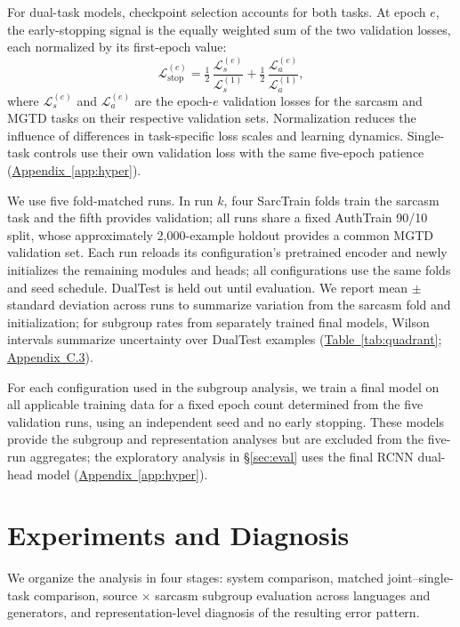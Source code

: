 \documentclass[11pt]{article}
\newcommand{\Sref}[1]{\hyperref[#1]{\S\ref*{#1}}}
\newcommand{\Appref}[1]{\hyperref[#1]{Appendix~\ref*{#1}}}
\newcommand{\Tabref}[1]{\hyperref[#1]{Table~\ref*{#1}}}
\begin{document}
For dual-task models, checkpoint selection accounts for both tasks. At epoch $e$, the early-stopping signal is the equally weighted sum of the two validation losses, each normalized by its first-epoch value:
\begin{equation}
\label{eq:stop}
\mathcal{L}_{\mathrm{stop}}^{(e)}=\tfrac{1}{2}\,\frac{\mathcal{L}_{s}^{(e)}}{\mathcal{L}_{s}^{(1)}}+\tfrac{1}{2}\,\frac{\mathcal{L}_{a}^{(e)}}{\mathcal{L}_{a}^{(1)}},
\end{equation}
where $\mathcal{L}_{s}^{(e)}$ and $\mathcal{L}_{a}^{(e)}$ are the epoch-$e$ validation losses for the sarcasm and MGTD tasks on their respective validation sets. Normalization reduces the influence of differences in task-specific loss scales and learning dynamics. Single-task controls use their own validation loss with the same five-epoch patience (\Appref{app:hyper}).

We use five fold-matched runs. In run $k$, four SarcTrain folds train the sarcasm task and the fifth provides validation; all runs share a fixed AuthTrain 90/10 split, whose approximately 2{,}000-example holdout provides a common MGTD validation set. Each run reloads its configuration's pretrained encoder and newly initializes the remaining modules and heads; all configurations use the same folds and seed schedule. DualTest is held out until evaluation. We report mean $\pm$ standard deviation across runs to summarize variation from the sarcasm fold and initialization; for subgroup rates from separately trained final models, Wilson intervals summarize uncertainty over DualTest examples (\Tabref{tab:quadrant}; \hyperref[app:c3]{Appendix~C.3}).

For each configuration used in the subgroup analysis, we train a final model on all applicable training data for a fixed epoch count determined from the five validation runs, using an independent seed and no early stopping. These models provide the subgroup and representation analyses but are excluded from the five-run aggregates; the exploratory analysis in \Sref{sec:eval} uses the final RCNN dual-head model (\Appref{app:hyper}).

\section{Experiments and Diagnosis}
\label{sec:exp}

We organize the analysis in four stages: system comparison, matched joint--single-task comparison, source $\times$ sarcasm subgroup evaluation across languages and generators, and representation-level diagnosis of the resulting error pattern.
\end{document}
